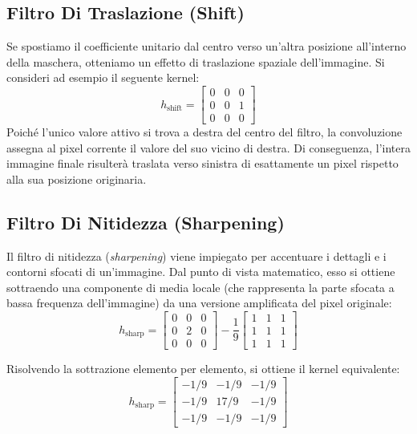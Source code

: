 ﻿\documentclass[11pt, a4paper]{article}
\begin{document}

\subsection{Filtro Di Traslazione (Shift)}

Se spostiamo il coefficiente unitario dal centro verso un'altra posizione all'interno della maschera, otteniamo un effetto di traslazione spaziale dell'immagine. Si consideri ad esempio il seguente kernel:
\[ h_{\text{shift}} = \begin{bmatrix} 0 & 0 & 0 \\ 0 & 0 & 1 \\ 0 & 0 & 0 \end{bmatrix} \]
Poiché l'unico valore attivo si trova a destra del centro del filtro, la convoluzione assegna al pixel corrente il valore del suo vicino di destra. Di conseguenza, l'intera immagine finale risulterà traslata verso sinistra di esattamente un pixel rispetto alla sua posizione originaria.


\subsection{Filtro Di Nitidezza (Sharpening)}

Il filtro di nitidezza (\emph{sharpening}) viene impiegato per accentuare i dettagli e i contorni sfocati di un'immagine. Dal punto di vista matematico, esso si ottiene sottraendo una componente di media locale (che rappresenta la parte sfocata a bassa frequenza dell'immagine) da una versione amplificata del pixel originale:
\[ h_{\text{sharp}} = \begin{bmatrix} 0 & 0 & 0 \\ 0 & 2 & 0 \\ 0 & 0 & 0 \end{bmatrix} - \frac{1}{9} \begin{bmatrix} 1 & 1 & 1 \\ 1 & 1 & 1 \\ 1 & 1 & 1 \end{bmatrix} \]

Risolvendo la sottrazione elemento per elemento, si ottiene il kernel equivalente:
\[ h_{\text{sharp}} = \begin{bmatrix} -1/9 & -1/9 & -1/9 \\ -1/9 & 17/9 & -1/9 \\ -1/9 & -1/9 & -1/9 \end{bmatrix} \]
\end{document}
